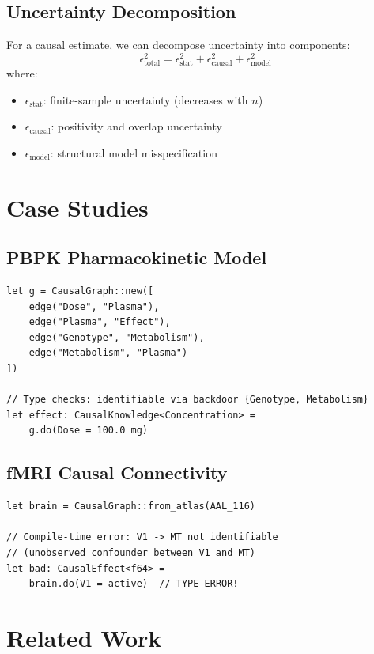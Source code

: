 \documentclass[11pt]{article}
\begin{document}
\subsection{Uncertainty Decomposition}
For a causal estimate, we can decompose uncertainty into components:
\[
\epsilon_{\text{total}}^2 = \epsilon_{\text{stat}}^2 + \epsilon_{\text{causal}}^2 + \epsilon_{\text{model}}^2
\]
where:
\begin{itemize}
\item $\epsilon_{\text{stat}}$: finite-sample uncertainty (decreases with $n$)
\item $\epsilon_{\text{causal}}$: positivity and overlap uncertainty
\item $\epsilon_{\text{model}}$: structural model misspecification
\end{itemize}

\section{Case Studies}

\subsection{PBPK Pharmacokinetic Model}
\begin{verbatim}
let g = CausalGraph::new([
    edge("Dose", "Plasma"),
    edge("Plasma", "Effect"),
    edge("Genotype", "Metabolism"),
    edge("Metabolism", "Plasma")
])

// Type checks: identifiable via backdoor {Genotype, Metabolism}
let effect: CausalKnowledge<Concentration> =
    g.do(Dose = 100.0 mg)
\end{verbatim}

\subsection{fMRI Causal Connectivity}
\begin{verbatim}
let brain = CausalGraph::from_atlas(AAL_116)

// Compile-time error: V1 -> MT not identifiable
// (unobserved confounder between V1 and MT)
let bad: CausalEffect<f64> =
    brain.do(V1 = active)  // TYPE ERROR!
\end{verbatim}

\section{Related Work}
\end{document}
